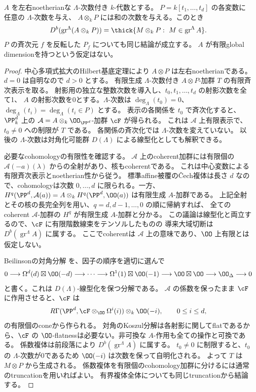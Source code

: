\begin{lemma}[非可換係数を持つ多項式拡大]\label{lem:polynomial-coefficient}
 \(A\) を左右noetherianな \(\Lambda\)-次数付き \(k\)-代数とする。
 \(P=k[t_1,\ldots,t_d]\) の各変数に任意の \(\Lambda\)-次数を与え、
 \(A\otimes_kP\) には和の次数を与える。このとき
 \[
 D^b(\operatorname{gr}^{\Lambda}(A\otimes_kP))
 =\thick\{M\otimes_kP:\ M\in\operatorname{gr}^{\Lambda}A\}.
 \]
 \(P\) の斉次元 \(f\) を反転した \(P_f\) についても同じ結論が成立する。
 \(A\) が有限global dimensionを持つという仮定はない。
\end{lemma}
\begin{proof}
 中心多項式拡大のHilbert基底定理により \(A\otimes P\) は左右noetherianである。
 \(d=0\) は自明なので \(d>0\) とする。
 有限生成 \(\Lambda\)-次数付き \(A\otimes P\)-加群 \(T\) の有限斉次表示を取る。
 射影用の独立な整数次数を導入し、\(t_0,t_1,\ldots,t_d\) の射影次数を全て1、
 \(A\) の射影次数を0とする。\(\Lambda\)-次数は
 \(\deg_\Lambda(t_0)=0\)、\(\deg_\Lambda(t_i)=\deg_\Lambda(t_i\in P)\) とする。
 表示の各関係を \(t_0\) で斉次化すると、\(\PP^d_k\) 上の
 \(\mathcal A=A\otimes_k\OO_{\PP^d}\)-加群 \(\cF\) が得られる。
 これは \(\mathcal A\) 上有限表示で、\(t_0\ne0\) への制限が \(T\) である。
 各関係の斉次化では \(\Lambda\)-次数を変えていない。
 以後の \(\Lambda\)-次数は対角化可能群 \(D(\Lambda)\) による線型化としても解釈できる。

 必要なcohomologyの有限性を確認する。
 \(\mathcal A\) 上のcoherent加群には有限個の
 \(\mathcal A(-a)(\lambda)\) からの全射があり、核もcoherentである。
 これは中心変数による有限斉次表示とnoetherian性から従う。
 標準affine被覆の\v Cech複体は長さ \(d\) なので、cohomologyは次数 \(0,\ldots,d\)
 に限られる。一方、\(H^q(\PP^d,\mathcal A(a))
 =A\otimes_kH^q(\PP^d,\OO(a))\) は有限生成 \(A\)-加群である。
 上記全射とその核の長完全列を用い、\(q=d,d-1,\ldots,0\) の順に帰納すれば、
 全てのcoherent \(\mathcal A\)-加群の \(H^q\) が有限生成 \(A\)-加群と分かる。
 この議論は線型化と両立するので、\(\cF\) に有限階数線束をテンソルしたものの
 導来大域切断は \(D^b(\operatorname{gr}^{\Lambda}A)\) に属する。
 ここでcoherentは \(\mathcal A\) 上の意味であり、\(\OO\) 上有限とは仮定しない。

 Beilinsonの対角分解 \cite{Beilinson} を、因子の順序を適切に選んで
 \[
 0\longrightarrow\Omega^d(d)\boxtimes\OO(-d)
 \longrightarrow\cdots\longrightarrow
 \Omega^1(1)\boxtimes\OO(-1)
 \longrightarrow\OO\boxtimes\OO
 \longrightarrow\OO_\Delta\longrightarrow0
 \]
 と書く。これは \(D(\Lambda)\)-線型化を保つ分解である。
 \(\mathcal A\) の係数を保ったまま \(\cF\) に作用させると、\(\cF\) は
 \[
 R\Gamma(\PP^d,\cF\otimes_{\OO}\Omega^i(i))\otimes_k\OO(-i),
 \qquad 0\le i\le d,
 \]
 の有限個のconeから作られる。
 対角のKoszul分解は各射影に関してflatであるから、\(\cF\) の
 \(\OO\)-flatnessは必要ない。非可換な \(A\)-作用も全ての操作と可換である。
 係数複体は前段落により \(D^b(\operatorname{gr}^{\Lambda}A)\) に属する。
 \(t_0\ne0\) に制限すると、\(t_0\) の \(\Lambda\)-次数が0であるため
 \(\OO(-i)\) は次数を保って自明化される。
 よって \(T\) は \(M\otimes P\) から生成される。
 係数複体を有限個のcohomology加群に分けるには通常のtruncationを用いればよい。
 有界複体全体についても同じtruncationから結論する。


\end{proof}
